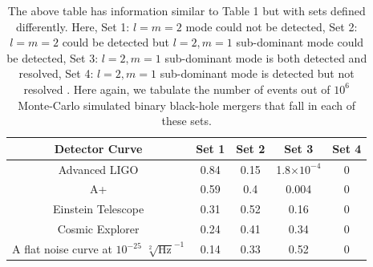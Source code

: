 \begin{table}[h!]
\centering
\begin{tabular}{||c c c c c ||} 
 \hline
 Detector Curve & Set 1 & Set 2 & Set 3 & Set 4 \\ [0.5ex] 
 \hline\hline
 Advanced LIGO & 0.84 & 0.15& 1.8$\times 10^{-4}$ & 0 \\
 A+ & 0.59 & 0.4& 0.004 & 0 \\
 Einstein Telescope & 0.31 & 0.52 & 0.16 &0 \\
 Cosmic Explorer & 0.24 & 0.41 & 0.34 &0 \\
 A flat noise curve at $10^{-25}$ $\sqrt[2]{\mathrm{Hz}}^{-1}$ & 0.14 & 0.33 & 0.52 &0 \\
 [1ex] 
 \hline
\end{tabular}
\caption{The above table has information similar to Table 1 but with sets defined differently. Here, Set 1: $l=m=2$ mode could not be detected, Set 2: $l=m=2$ could be detected but $l=2, m=1$ sub-dominant mode could be detected, Set 3: $l=2, m=1$ sub-dominant mode is both detected and resolved, Set 4: $l=2, m=1$ sub-dominant mode is detected but not resolved . Here again, we tabulate the number of events out of $10^{6}$ Monte-Carlo simulated binary black-hole mergers that fall in each of these sets.}
\label{table:2}
\end{table}




